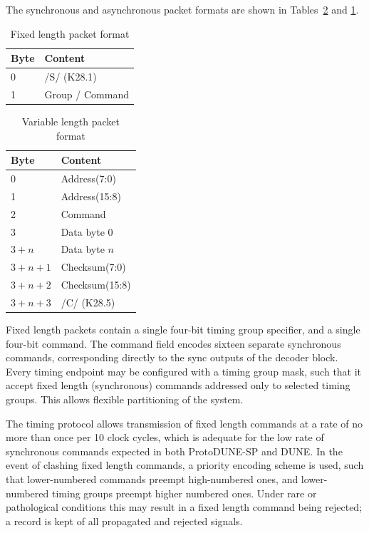 \documentclass[a4paper,11pt]{article}
\begin{document}
The synchronous and asynchronous packet formats are shown in Tables~\ref{tab:async} and \ref{tab:sync}.

\begin{table}[h!]
  \centering
  \begin{tabular}{@{}ll@{}} \toprule
    Byte & Content \\ \midrule
    0 & /S/ (K28.1) \\
    1 & Group / Command \\ \bottomrule
  \end{tabular}
  \caption{Fixed length packet format}
  \label{tab:sync}
\end{table}

\begin{table}[h!]
  \centering
  \begin{tabular}{@{}ll@{}} \toprule
    Byte & Content \\ \midrule
    0 & Address(7:0) \\
    1 & Address(15:8) \\
    2 & Command \\
    3 & Data byte 0 \\ 
    $3 + n$ & Data byte $n$ \\ 
    $3 + n + 1$ & Checksum(7:0) \\
    $3 + n + 2$ & Checksum(15:8) \\
    $3 + n + 3$ & /C/ (K28.5) \\ \bottomrule
  \end{tabular}
  \caption{Variable length packet format}
  \label{tab:async}
\end{table}

Fixed length packets contain a single four-bit timing group specifier, and a single four-bit command. The command field encodes sixteen separate synchronous commands, corresponding directly to the sync outputs of the decoder block. Every timing endpoint may be configured with a timing group mask, such that it accept fixed length (synchronous) commands addressed only to selected timing groups. This allows flexible partitioning of the system.

The timing protocol allows transmission of fixed length commands at a rate of no more than once per 10 clock cycles, which is adequate for the low rate of synchronous commands expected in both ProtoDUNE-SP and DUNE. In the event of clashing fixed length commands, a priority encoding scheme is used, such that lower-numbered commands preempt high-numbered ones, and lower-numbered timing groups preempt higher numbered ones. Under rare or pathological conditions this may result in a fixed length command being rejected; a record is kept of all propagated and rejected signals.
\end{document}
